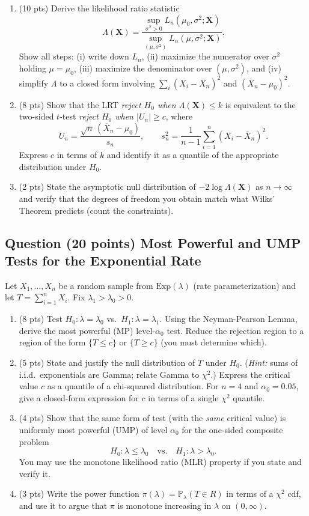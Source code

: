 \documentclass[11pt]{article}
\newcounter{qnum}
\newcommand{\question}[2]{\stepcounter{qnum}\subsection*{Question \theqnum \quad (#1 points) \hfill #2}}
\begin{document}
\begin{enumerate}[label=(\alph*),leftmargin=2em]
    \item (10 pts) Derive the likelihood ratio statistic
    \[ \Lambda(\mathbf{X}) = \frac{\sup_{\sigma^2 > 0} L_n(\mu_0,\sigma^2; \mathbf{X})}{\sup_{(\mu,\sigma^2)} L_n(\mu,\sigma^2; \mathbf{X})}. \]
    Show all steps: (i) write down $L_n$, (ii) maximize the numerator over $\sigma^2$ holding $\mu = \mu_0$, (iii) maximize the denominator over $(\mu,\sigma^2)$, and (iv) simplify $\Lambda$ to a closed form involving $\sum_i (X_i - \overline{X}_n)^2$ and $(\overline{X}_n - \mu_0)^2$.
    \item (8 pts) Show that the LRT \emph{reject $H_0$ when $\Lambda(\mathbf{X}) \le k$} is equivalent to the two-sided $t$-test \emph{reject $H_0$ when $|U_n| \ge c$}, where
    \[ U_n = \frac{\sqrt{n}\,(\overline{X}_n - \mu_0)}{s_n}, \qquad s_n^2 = \frac{1}{n-1}\sum_{i=1}^n (X_i - \overline{X}_n)^2. \]
    Express $c$ in terms of $k$ and identify it as a quantile of the appropriate distribution under $H_0$.
    \item (2 pts) State the asymptotic null distribution of $-2\log\Lambda(\mathbf{X})$ as $n \to \infty$ and verify that the degrees of freedom you obtain match what Wilks' Theorem predicts (count the constraints).
\end{enumerate}

\question{20}{Most Powerful and UMP Tests for the Exponential Rate}
Let $X_1,\ldots,X_n$ be a random sample from $\mathrm{Exp}(\lambda)$ (rate parameterization) and let $T = \sum_{i=1}^n X_i$. Fix $\lambda_1 > \lambda_0 > 0$.

\begin{enumerate}[label=(\alph*),leftmargin=2em]
    \item (8 pts) Test $H_0: \lambda = \lambda_0$ vs.\ $H_1: \lambda = \lambda_1$. Using the Neyman-Pearson Lemma, derive the most powerful (MP) level-$\alpha_0$ test. Reduce the rejection region to a region of the form $\{T \le c\}$ or $\{T \ge c\}$ (you must determine which).
    \item (5 pts) State and justify the null distribution of $T$ under $H_0$. (\emph{Hint:} sums of i.i.d.\ exponentials are Gamma; relate Gamma to $\chi^2$.) Express the critical value $c$ as a quantile of a chi-squared distribution. For $n=4$ and $\alpha_0 = 0.05$, give a closed-form expression for $c$ in terms of a single $\chi^2$ quantile.
    \item (4 pts) Show that the same form of test (with the \emph{same} critical value) is uniformly most powerful (UMP) of level $\alpha_0$ for the one-sided composite problem
    \[ H_0: \lambda \le \lambda_0 \quad \text{vs.} \quad H_1: \lambda > \lambda_0. \]
    You may use the monotone likelihood ratio (MLR) property if you state and verify it.
    \item (3 pts) Write the power function $\pi(\lambda) = \mathbb{P}_\lambda(T \in R)$ in terms of a $\chi^2$ cdf, and use it to argue that $\pi$ is monotone increasing in $\lambda$ on $(0,\infty)$.
\end{enumerate}
\end{document}
